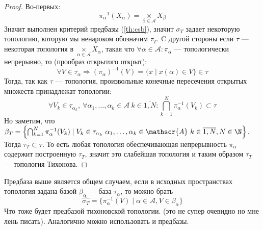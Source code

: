 \begin{proof}
	Во-первых: 
	$$
	\pi_\alpha^{-1}(X_\alpha) = \underset{\beta \in \mathscr{A}}{\times} X_\beta
	$$
	Значит выполнен критерий предбазы (\ref{th:csb}), значит $\sigma_T$ задает некоторую топологию, которую мы ненароком обозначим $\tau_T$. C другой стороны если $\tau$ --- некоторая топология в $\underset{\alpha \in \mathscr{A}}{\times} X_\alpha$, такая что $\forall \alpha \in \mathscr{A} :\pi_\alpha$ --- топологически непрерывно, то (прообраз открытого открыт):
	$$
	\forall V \in \tau_\alpha \Rightarrow (\pi_\alpha)^{-1}(V)  = \{x \mid x(\alpha) \in V\}\in \tau
	$$
	Тогда, так как $\tau$ --- топология, произвольные конечные пересечения открытых множеств принадлежат топологии:
	$$
	\forall V_k \in \tau_{\alpha_k}, \ \forall \alpha_1, \dots, \alpha_k \in \mathscr{A} \ k \in \overline{1, N}: \bigcap_{k = 1}^N \pi_\alpha^{-1}(V_k) \subset \tau
	$$
	Но заметим, что $\beta_T =  \left\{\bigcap_{k = 1}^N \pi_\alpha^{-1}(V_k) \mid  V_k \in \tau_{\alpha_k}\ \alpha_1, \dots, \alpha_k \in \mathscr{A} \ k \in \overline{1, N}, N \in \N\right\}$. Тогда $\tau_T \subset \tau$. То есть любая топология обеспечивающая непрерывность $\pi_\alpha$ содержит построенную $\tau_T$, значит это слабейшая топология и таким образом $\tau_T$ --- топология Тихонова.
\end{proof}
\begin{remark}
	Предбаза выше является общем случаем, если в исходных пространствах топология задана базой $\beta_\alpha$ --- база $\tau_\alpha$, то можно брать
	$$
	\hat{\sigma_T} = \{\pi_\alpha^{-1}(V) \mid \alpha \in \mathscr{A}, V \in \beta_\alpha\}
	$$
	Что тоже будет предбазой тихоновской топологии. (это не супер очевидно но мне лень писать). Аналогично можно использовать и предбазы. 
\end{remark}

